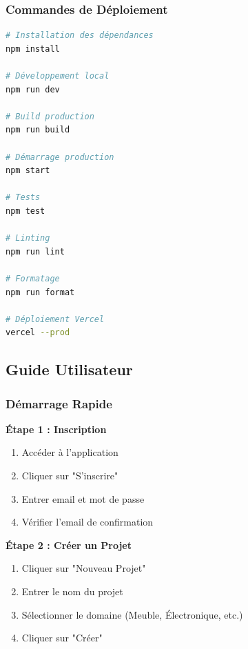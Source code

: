 \subsubsection{Commandes de Déploiement}

\begin{lstlisting}[language=bash, caption=Scripts de déploiement]
# Installation des dépendances
npm install

# Développement local
npm run dev

# Build production
npm run build

# Démarrage production
npm start

# Tests
npm test

# Linting
npm run lint

# Formatage
npm run format

# Déploiement Vercel
vercel --prod
\end{lstlisting}

\subsection{Guide Utilisateur}

\subsubsection{Démarrage Rapide}

\textbf{Étape 1 : Inscription}
\begin{enumerate}
    \item Accéder à l'application
    \item Cliquer sur "S'inscrire"
    \item Entrer email et mot de passe
    \item Vérifier l'email de confirmation
\end{enumerate}

\textbf{Étape 2 : Créer un Projet}
\begin{enumerate}
    \item Cliquer sur "Nouveau Projet"
    \item Entrer le nom du projet
    \item Sélectionner le domaine (Meuble, Électronique, etc.)
    \item Cliquer sur "Créer"
\end{enumerate}

